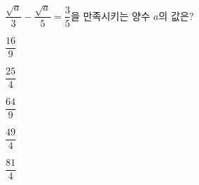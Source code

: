 $\dfrac{\sqrt{a}}{3}-\dfrac{\sqrt{a}}{5}=\dfrac{3}{5}$을 만족시키는 양수 $a$의 값은?
\begin{choices32}{\rule[-3ex]{0pt}{8ex}$\dfrac{16}{9}$}{\rule[-3ex]{0pt}{8ex}$\dfrac{25}{4}$}{\rule[-3ex]{0pt}{8ex}$\dfrac{64}{9}$}{\rule[-3ex]{0pt}{8ex}$\dfrac{49}{4}$}{\rule[-3ex]{0pt}{8ex}$\dfrac{81}{4}$}\end{choices32}
